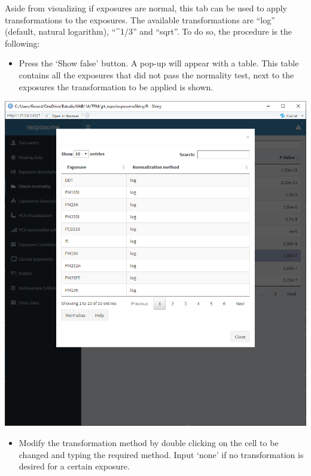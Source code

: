 \documentclass[
]{book}
\providecommand{\tightlist}{%
  \setlength{\itemsep}{0pt}\setlength{\parskip}{0pt}}
\begin{document}
Aside from visualizing if exposures are normal, this tab can be used to apply transformations to the exposures. The available transformations are ``log'' (default, natural logarithm), ``\^{}1/3'' and ``sqrt''. To do so, the procedure is the following:

\begin{itemize}
\tightlist
\item
  Press the `Show false' button. A pop-up will appear with a table. This table contains all the exposures that did not pass the normality test, next to the exposures the transformation to be applied is shown.
\end{itemize}

\includegraphics{images/analysis3_3.png}

\begin{itemize}
\tightlist
\item
  Modify the transformation method by double clicking on the cell to be changed and typing the required method. Input `none' if no transformation is desired for a certain exposure.
\end{itemize}
\end{document}
